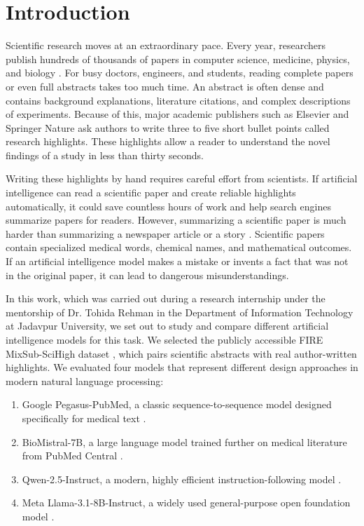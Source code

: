 \documentclass[11pt,a4paper]{article}
\begin{document}
\section{Introduction}
\label{sec:intro}
Scientific research moves at an extraordinary pace. Every year, researchers publish hundreds of thousands of papers in computer science, medicine, physics, and biology \cite{fire2026mixsub}. For busy doctors, engineers, and students, reading complete papers or even full abstracts takes too much time. An abstract is often dense and contains background explanations, literature citations, and complex descriptions of experiments. Because of this, major academic publishers such as Elsevier and Springer Nature ask authors to write three to five short bullet points called research highlights. These highlights allow a reader to understand the novel findings of a study in less than thirty seconds.

Writing these highlights by hand requires careful effort from scientists. If artificial intelligence can read a scientific paper and create reliable highlights automatically, it could save countless hours of work and help search engines summarize papers for readers. However, summarizing a scientific paper is much harder than summarizing a newspaper article or a story \cite{maynez2020faithfulness}. Scientific papers contain specialized medical words, chemical names, and mathematical outcomes. If an artificial intelligence model makes a mistake or invents a fact that was not in the original paper, it can lead to dangerous misunderstandings.

In this work, which was carried out during a research internship under the mentorship of Dr. Tohida Rehman in the Department of Information Technology at Jadavpur University, we set out to study and compare different artificial intelligence models for this task. We selected the publicly accessible FIRE MixSub-SciHigh dataset \cite{fire2026mixsub}, which pairs scientific abstracts with real author-written highlights. We evaluated four models that represent different design approaches in modern natural language processing:
\begin{enumerate}
    \item Google Pegasus-PubMed, a classic sequence-to-sequence model designed specifically for medical text \cite{zhang2020pegasus}.
    \item BioMistral-7B, a large language model trained further on medical literature from PubMed Central \cite{labrak2024biomistral}.
    \item Qwen-2.5-Instruct, a modern, highly efficient instruction-following model \cite{yang2024qwen25}.
    \item Meta Llama-3.1-8B-Instruct, a widely used general-purpose open foundation model \cite{dubey2024llama3}.
\end{enumerate}
\end{document}
